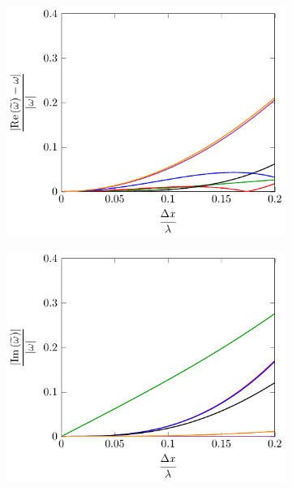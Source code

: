 \begin{figure}
	\centering
	\begin{subfigure}{0.5\textwidth}
		\includegraphics[width=\textwidth]{./chp4/figures/Dispu1khShallRez.pdf}
	\end{subfigure}%
	\begin{subfigure}{0.5\textwidth}
		\includegraphics[width=\textwidth]{./chp4/figures/Dispu1khShallImz.pdf}
	\end{subfigure}
	\begin{subfigure}{0.5\textwidth}

\end{subfigure}
\end{figure}

